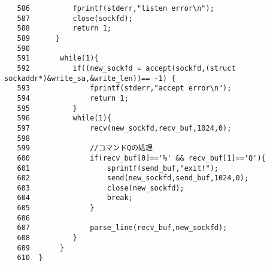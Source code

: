 \documentclass{jarticle}[11pt]
\begin{document}
\begin{verbatim}
   586	        fprintf(stderr,"listen error\n");
   587	        close(sockfd);
   588	        return 1;
   589	    }
   590	   
   591	     while(1){
   592	        if((new_sockfd = accept(sockfd,(struct sockaddr*)&write_sa,&write_len))== -1) {
   593	            fprintf(stderr,"accept error\n");
   594	            return 1;
   595	        }
   596	        while(1){
   597	            recv(new_sockfd,recv_buf,1024,0);
   598	
   599	            //コマンドQの処理
   600	            if(recv_buf[0]=='%' && recv_buf[1]=='Q'){
   601	                sprintf(send_buf,"exit!");
   602	                send(new_sockfd,send_buf,1024,0);
   603	                close(new_sockfd);
   604	                break;
   605	            }
   606	
   607	            parse_line(recv_buf,new_sockfd);  
   608	        }
   609	     }
   610	}
\end{verbatim}
\end{document}
